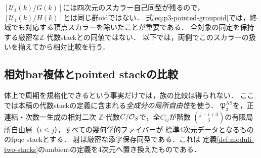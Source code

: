 \begin{remark}[スカラー商のlevel]
$[\mathcal U_4(k)/G(k)]$には四次元のスカラー自己同型が残るので，
$[\mathcal U_4(k)/H(k)]$とは同じ群oidではない．
式\eqref{eq:p3-pointed-groupoid}では，終域でも対応する頂点スカラーを除いたことが重要である．
全対象の同定を保持する厳密な$\mathbb Z$-代数stackとの同値ではない．
以下では，両側でこのスカラーの扱いを揃えてから相対比較を行う．
\end{remark}

\subsection{相対bar複体とpointed stackの比較}

体上で周期を規格化できるという事実だけでは，族の比較は得られない．
ここでは本稿の代数stackの定義に含まれる\emph{全成分の局所自由性}を使う．
$\mathfrak P_3^{\mathrm{AS}}$を，正連結・次数一生成の相対二次
$\mathbb Z$-代数$C/\mathcal O_S$で，全$C_{ij}$が階数
$\binom{j-i+3}{3}$の有限局所自由層（$i\le j$），すべての幾何学的ファイバーが
標準4次元データとなるもののfpqc stackとする．
射は厳密な添字保存同型である．これは
定義\ref{def:moduli-two-stacks}のambientの定義を4次元へ置き換えたものである．

